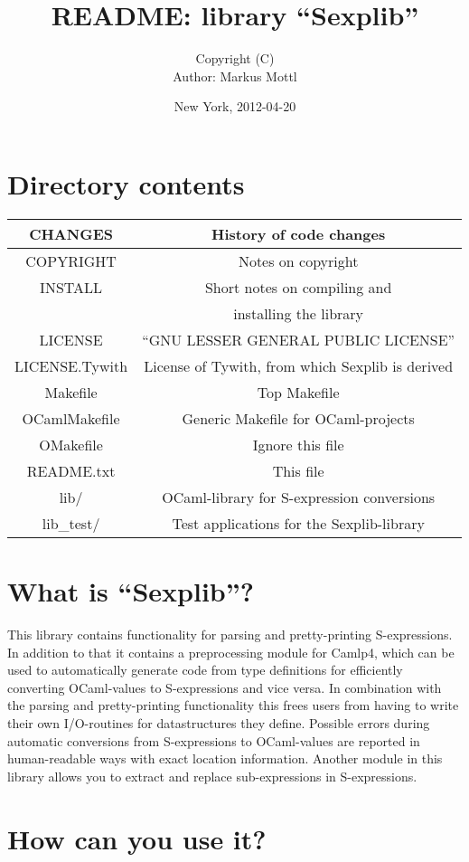 \documentclass[a4paper]{article}
\title{README: library ``Sexplib''}
\author{
  Copyright \quad (C) \quad \theyear \quad \janeshort \quad\\
  Author: Markus Mottl
}
\date{New York, 2012-04-20}
\newcommand{\trow}[2]{\quad #1 \quad&\quad #2 \quad\\}
\newcommand{\trowl}[2]{\trow{#1}{#2}\hline}
\begin{document}
\maketitle
\section{Directory contents}
\begin{center}
\begin{tabular}{|c|c|}
\hline
\trowl{CHANGES}{History of code changes}
\trowl{COPYRIGHT}{Notes on copyright}
\trow{INSTALL}{Short notes on compiling and}
\trowl{}{installing the library}
\trowl{LICENSE}{``GNU LESSER GENERAL PUBLIC LICENSE''}
\trowl{LICENSE.Tywith}{License of Tywith, from which Sexplib is derived}
\trowl{Makefile}{Top Makefile}
\trowl{OCamlMakefile}{Generic Makefile for OCaml-projects}
\trowl{OMakefile}{Ignore this file}
\trowl{README.txt}{This file}
\trowl{lib/}{OCaml-library for S-expression conversions}
\trowl{lib\_test/}{Test applications for the Sexplib-library}
\end{tabular}
\end{center}

\section{What is ``Sexplib''?}

This library contains functionality for parsing and pretty-printing
S-expressions.  In addition to that it contains a preprocessing module for
Camlp4, which can be used to automatically generate code from type definitions
for efficiently converting OCaml-values to S-expressions and vice versa.
In combination with the parsing and pretty-printing functionality this frees
users from having to write their own I/O-routines for datastructures they
define.  Possible errors during automatic conversions from S-expressions
to OCaml-values are reported in human-readable ways with exact location
information.  Another module in this library allows you to extract and
replace sub-expressions in S-expressions.

\section{How can you use it?}
\end{document}
